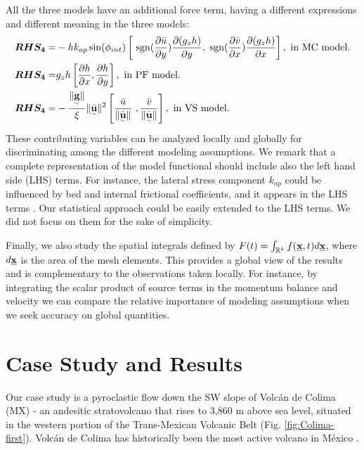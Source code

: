 \documentclass{article}
\begin{document}
All the three models have an additional force term, having a different expressions and different meaning in the three models:
\begin{align}
\boldsymbol{RHS_4} =&  - h k_{ap}\sin(\phi_{int})\left[ \ {\rm sgn}(\frac{\partial \bar{u}}{\partial y}) \frac{\partial (g_z h)}{\partial y},\ {\rm sgn}({\frac{\partial \bar{v}}{\partial x}}) \frac{\partial (g_z h)}{\partial x}\right],\textmd{ in MC model.}\nonumber\\
\boldsymbol{RHS_4} =& g_{z}h\left[\frac{\partial h}{\partial x}, \frac{\partial h}{\partial y}\right],\textmd{ in PF model.}\\
\boldsymbol{RHS_4} =& -\frac{\| \underset{^\sim}{\textbf g} \|}{\xi}\| \underset{^\sim}{\bar{\textbf u}} \|^2\left[\frac{\bar{u}}{\| \underset{^\sim}{\bar{\textbf u}}\|} \ ,\frac{\bar{v}}{\| \underset{^\sim}{\bar{\textbf u}}\|}\right],\textmd{ in VS model.}\nonumber
\end{align}
These contributing variables can be analyzed locally and globally for discriminating among the different modeling assumptions. We remark that a complete representation of the model functional should include also the left hand side (LHS) terms. For instance, the lateral stress component $k_{ap}$ could be influenced by bed and internal frictional coefficients, and it appears in the LHS terms \citep{Gray1999,Pirulli2007}. Our statistical approach could be easily extended to the LHS terms. We did not focus on them for the sake of simplicity.

Finally, we also study the spatial integrals defined by $F(t)=\int_{\mathbb R^k}f(\underline{\textbf x},t) d\underline{\textbf x}$, where $d\underline{\textbf x}$ is the area of the mesh elements. This provides a global view of the results and is complementary to the observations taken locally. For instance, by integrating the scalar product of source terms in the momentum balance and velocity we can compare the relative importance of modeling assumptions when we seek accuracy on global quantities.

\section{Case Study and Results}\label{QoI2}
Our case study is a pyroclastic flow down the SW slope of Volc{\'a}n de Colima (MX) - an andesitic stratovolcano that rises to 3,860 m above sea level, situated in the western portion of the Trans-Mexican Volcanic Belt (Fig. \ref{fig:Colima-first}). Volc{\'a}n de Colima has historically been the most active volcano in M{\'e}xico \citep{DeLaCruzReina1993, Zobin2002, Gonzalez2002}.
\end{document}
